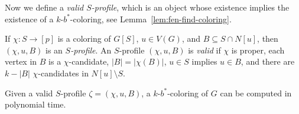 \documentclass[runningheads, envcountsame]{llncs}
\newcommand{\seq}{\subseteq}
\begin{document}
Now we define a \emph{valid $S$-profile}, which is an object whose existence implies the existence of a $k$-$b^*$-coloring, see Lemma~\ref{lem:fen-find-coloring}.

\begin{definition}\label{def:fen-profile}
If $\chi\colon S \rightarrow [p]$ is a coloring of $G[S]$, $u \in V(G)$, and $B \seq S \cap N[u]$, then $(\chi, u, B)$ is an \emph{$S$-profile}.
An $S$-profile $(\chi, u, B)$ is \emph{valid} if $\chi$ is proper, each vertex in $B$ is a $\chi$-candidate, $|B| = |\chi(B)|$, $u \in S$ implies $u \in B$, and there are $k-|B|$ $\chi$-candidates in $N[u] \setminus S$.
\end{definition}

\begin{lemma}\label{lem:fen-find-coloring}
Given a valid $S$-profile $\zeta = (\chi, u, B)$, a $k$-$b^*$-coloring of $G$ can be computed in polynomial time.
\end{lemma}
\end{document}
